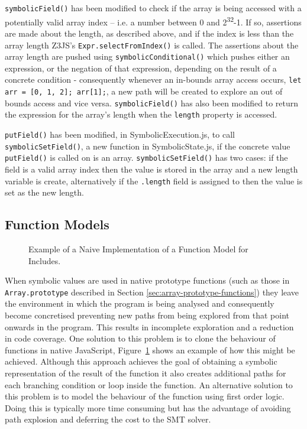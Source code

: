 \documentclass[]{final_report}
\begin{document}
\lstinline|symbolicField()| has been modified to check if the array is being accessed with a potentially valid array index -- i.e. a number between 0 and 2\textsuperscript{32}-1. If so, assertions are made about the length, as described above, and if the index is less than the array length Z3JS's \lstinline|Expr.selectFromIndex()| is called. The assertions about the array length are pushed using \lstinline|symbolicConditional()| which pushes either an expression, or the negation of that expression, depending on the result of a concrete condition - consequently whenever an in-bounds array access occurs, \lstinline|let arr = [0, 1, 2]; arr[1];|, a new path will be created to explore an out of bounds access and vice versa. \lstinline|symbolicField()| has also been modified to return the expression for the array's length when the \lstinline|length| property is accessed.

\lstinline|putField()| has been modified, in SymbolicExecution.js, to call \lstinline|symbolicSetField()|, a new function in SymbolicState.js, if the concrete value \lstinline|putField()| is called on is an array. \lstinline|symbolicSetField()| has two cases: if the field is a valid array index then the value is stored in the array and a new length variable is create, alternatively if the \lstinline|.length| field is assigned to then the value is set as the new length.

\subsection{Function Models}
\begin{figure}[t]

\caption{\label{fig:naive-includes} Example of a Naive Implementation of a Function Model for Includes.}
\end{figure}

When symbolic values are used in native prototype functions (such as those in \lstinline{Array.prototype} described in Section \ref{sec:array-prototype-functions}) they leave the environment in which the program is being analysed and consequently become concretised preventing new paths from being explored from that point onwards in the program. This results in incomplete exploration and a reduction in code coverage. One solution to this problem is to clone the behaviour of functions in native JavaScript, Figure~\ref{fig:naive-includes} shows an example of how this might be achieved. Although this approach achieves the goal of obtaining a symbolic representation of the result of the function it also creates additional paths for each branching condition or loop inside the function. An alternative solution to this problem is to model the behaviour of the function using first order logic. Doing this is typically more time consuming but has the advantage of avoiding path explosion and deferring the cost to the SMT solver.
\end{document}
